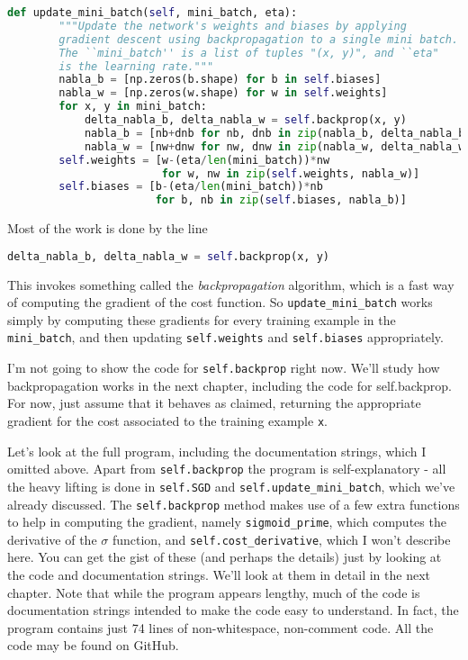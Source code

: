 \begin{fullwidth}
\begin{lstlisting}[language=Python]
    def update_mini_batch(self, mini_batch, eta):
        """Update the network's weights and biases by applying
        gradient descent using backpropagation to a single mini batch.
        The ``mini_batch'' is a list of tuples "(x, y)", and ``eta"
        is the learning rate."""
        nabla_b = [np.zeros(b.shape) for b in self.biases]
        nabla_w = [np.zeros(w.shape) for w in self.weights]
        for x, y in mini_batch:
            delta_nabla_b, delta_nabla_w = self.backprop(x, y)
            nabla_b = [nb+dnb for nb, dnb in zip(nabla_b, delta_nabla_b)]
            nabla_w = [nw+dnw for nw, dnw in zip(nabla_w, delta_nabla_w)]
        self.weights = [w-(eta/len(mini_batch))*nw 
                        for w, nw in zip(self.weights, nabla_w)]
        self.biases = [b-(eta/len(mini_batch))*nb 
                       for b, nb in zip(self.biases, nabla_b)]
\end{lstlisting}
\end{fullwidth}
                       
Most of the work is done by the line 

\begin{lstlisting}[language=Python]
    delta_nabla_b, delta_nabla_w = self.backprop(x, y)
\end{lstlisting}

This invokes something called the \textit{backpropagation} algorithm, which is a fast way of computing the gradient of the cost function. So \lstinline{update_mini_batch} works simply by computing these gradients for every training example in the \lstinline{mini_batch}, and then updating \lstinline{self.weights} and \lstinline{self.biases} appropriately.

I'm not going to show the code for \lstinline{self.backprop} right now. We'll study how backpropagation works in the next chapter, including the code for self.backprop. For now, just assume that it behaves as claimed, returning the appropriate gradient for the cost associated to the training example \lstinline{x}.

Let's look at the full program, including the documentation strings, which I omitted above. Apart from \lstinline{self.backprop} the program is self-explanatory - all the heavy lifting is done in \lstinline{self.SGD} and \lstinline{self.update_mini_batch}, which we've already discussed. The \lstinline{self.backprop} method makes use of a few extra functions to help in computing the gradient, namely \lstinline{sigmoid_prime}, which computes the derivative of the $\sigma$ function, and \lstinline{self.cost_derivative}, which I won't describe here. You can get the gist of these (and perhaps the details) just by looking at the code and documentation strings. We'll look at them in detail in the next chapter. Note that while the program appears lengthy, much of the code is documentation strings intended to make the code easy to understand. In fact, the program contains just 74 lines of non-whitespace, non-comment code. All the code may be found on GitHub.


